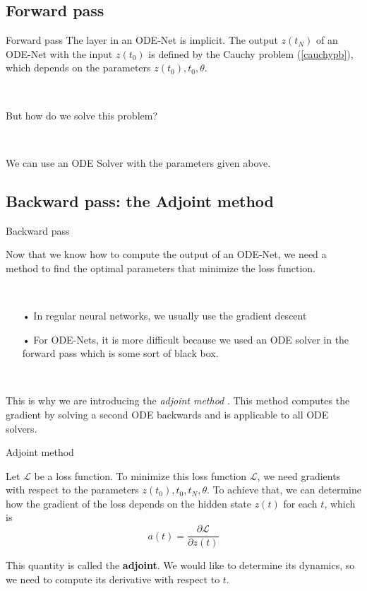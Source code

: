 \documentclass[11pt]{beamer}
\begin{document}
\subsection{Forward pass}
\begin{frame}{Forward pass}
The layer in an ODE-Net is implicit. The output $z(t_N)$ of an ODE-Net with the input $z(t_0)$ is defined by the Cauchy problem (\ref{cauchypb}), which depends on the parameters $z(t_0),t_0,\theta$.

~
\begin{center}
But how do we solve this problem?
\end{center}


~

We can use an ODE Solver with the parameters given above.
\end{frame}

\subsection{Backward pass: the Adjoint method}
\begin{frame}{Backward pass}

Now that we know how to compute the output of an ODE-Net, we need a method to find the optimal parameters that minimize the loss function.

~
\begin{itemize}
\item[•] In regular neural networks, we usually use the gradient descent
\item[•] For ODE-Nets, it is more difficult because we used an ODE solver in the forward pass which is some sort of black box.
\end{itemize}

~

This is why we are introducing the \textit{adjoint method} \cite{12}. This method computes the gradient by solving a second ODE backwards and is applicable to all ODE solvers.

\end{frame}
\begin{frame}{Adjoint method}

Let $\mathcal{L}$ be a loss function. To minimize this loss function $\mathcal{L}$, we need gradients with respect to the parameters $z(t_0),t_0,t_N,\theta$. To achieve that, we can determine how the gradient of the loss depends on the hidden state $z(t)$ for each $t$, which is
\begin{equation}
a(t)= \frac{\partial \mathcal{L}}{\partial z(t)}
\end{equation}

This quantity is called the \textbf{adjoint}. We would like to determine its dynamics, so we need to compute its derivative with respect to $t$.

\end{frame}
\end{document}
